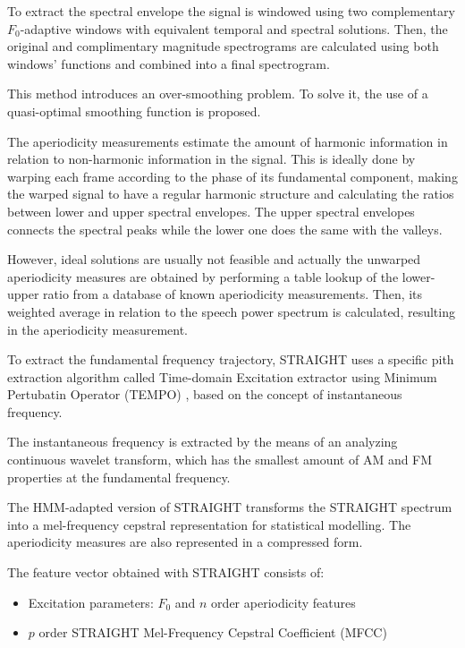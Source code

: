 To extract the spectral envelope the signal is windowed using two complementary $F_{0}$-adaptive windows with equivalent temporal and spectral solutions.
%
Then, the original and complimentary magnitude spectrograms are calculated using both windows' functions and combined into a final spectrogram.

This method introduces an over-smoothing problem.
% 
To solve it, the use of a quasi-optimal smoothing function is proposed.

The aperiodicity measurements estimate the amount of harmonic information in relation to non-harmonic information in the signal.
%
This is ideally done by warping each frame according to the phase of its fundamental component, making the warped signal to have a regular harmonic structure and calculating the ratios between lower and upper spectral envelopes.
%
The upper spectral envelopes connects the spectral peaks while the lower one does the same with the valleys.

However, ideal solutions are usually not feasible and actually the unwarped aperiodicity measures are obtained by performing a table lookup of the lower-upper ratio from a database of known aperiodicity measurements.
%
Then, its weighted average in relation to the speech power spectrum is calculated, resulting in the aperiodicity measurement.

To extract the fundamental frequency trajectory, STRAIGHT uses a specific pith extraction algorithm called Time-domain Excitation extractor using Minimum Pertubatin Operator (TEMPO) \cite{kawahara1999restructuring}, based on the concept of instantaneous frequency.

The instantaneous frequency is extracted by the means of an analyzing continuous wavelet transform, which has the smallest amount of AM and FM properties at the fundamental frequency.

The HMM-adapted version of STRAIGHT transforms the STRAIGHT spectrum into a mel-frequency cepstral representation for statistical modelling.
%
The aperiodicity measures are also represented in a compressed form.

The feature vector obtained with STRAIGHT consists of:

\begin{itemize}
	\item Excitation parameters: $F_{0}$ and $n$ order aperiodicity features
	\item $p$ order STRAIGHT Mel-Frequency Cepstral Coefficient (MFCC)
\end{itemize}

